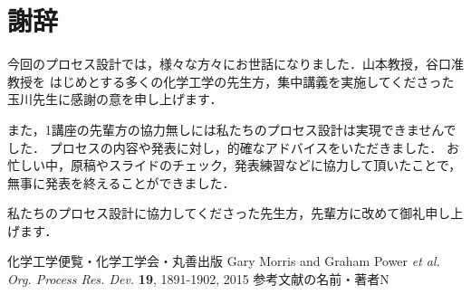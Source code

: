 \newpage
\chapter*{謝辞}
今回のプロセス設計では，様々な方々にお世話になりました．山本教授，谷口准教授を
はじめとする多くの化学工学の先生方，集中講義を実施してくださった玉川先生に感謝の意を申し上げます．
\par
また，1講座の先輩方の協力無しには私たちのプロセス設計は実現できませんでした．
プロセスの内容や発表に対し，的確なアドバイスをいただきました．
お忙しい中，原稿やスライドのチェック，発表練習などに協力して頂いたことで，無事に発表を終えることができました．
\par
私たちのプロセス設計に協力してくださった先生方，先輩方に改めて御礼申し上げます．


\newpage

\begin{thebibliography}{10}
     化学工学便覧・化学工学会・丸善出版
     Gary Morris and  Graham Power \textit{et al.  Org. Process Res. Dev.} \textbf{19}, 1891-1902, 2015
     参考文献の名前・著者N
\end{thebibliography}


\newpage
